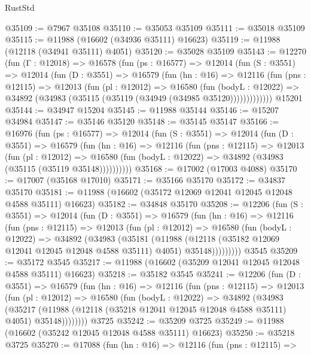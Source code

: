 \begin{lexlean}{RustStd}
\begin{coremodule}
@35109 := @7967 @35108
@35110 := @35053 @35109
@35111 := @35018 @35109
@35115 := @11988 (@16602 (@34936 @35111) @16623)
@35119 := @11988 (@12118 (@34941 @35111) @4051)
@35120 := @35028 @35109
@35143 := @12270
    (fun (Γ : @12018) =>
    @16578
      (fun (ps : @16577) =>
      @12014
        (fun (S : @3551) =>
        @12014
          (fun (D : @3551) =>
          @16579
            (fun (hn : @16) =>
            @12116
              (fun (pns : @12115) =>
              @12013
                (fun (pl : @12012) =>
                @16580
                  (fun (bodyL : @12022) =>
                  @34892 (@34983 (@35115 (@35119 (@34949 (@34985 @35120)))))))))))))
    @15201
@35144 := @34947 @15204
@35145 := @11988 @35144
@35146 := @15207 @34984
@35147 := @35146 @35120
@35148 := @35145 @35147
@35166 := @16976
    (fun (ps : @16577) =>
    @12014
      (fun (S : @3551) =>
      @12014
        (fun (D : @3551) =>
        @16579
          (fun (hn : @16) =>
          @12116
            (fun (pns : @12115) =>
            @12013
              (fun (pl : @12012) =>
              @16580 (fun (bodyL : @12022) => @34892 (@34983 (@35115 (@35119 @35148))))))))))
@35168 := @17002 (@17003 @4088)
@35170 := @17007 (@35168 @17010)
@35171 := @35166 @35170
@35172 := @34837 @35170
@35181 := @11988 (@16602 (@35172 @12069 @12041 @12045 @12048 @4588 @35111) @16623)
@35182 := @34848 @35170
@35208 := @12206
    (fun (S : @3551) =>
    @12014
      (fun (D : @3551) =>
      @16579
        (fun (hn : @16) =>
        @12116
          (fun (pns : @12115) =>
          @12013
            (fun (pl : @12012) =>
            @16580
              (fun (bodyL : @12022) =>
              @34892
                (@34983
                  (@35181
                    (@11988
                      (@12118 (@35182 @12069 @12041 @12045 @12048 @4588 @35111) @4051)
                      @35148)))))))))
    @3545
@35209 := @35172 @3545
@35217 := @11988 (@16602 (@35209 @12041 @12045 @12048 @4588 @35111) @16623)
@35218 := @35182 @3545
@35241 := @12206
    (fun (D : @3551) =>
    @16579
      (fun (hn : @16) =>
      @12116
        (fun (pns : @12115) =>
        @12013
          (fun (pl : @12012) =>
          @16580
            (fun (bodyL : @12022) =>
            @34892
              (@34983
                (@35217
                  (@11988 (@12118 (@35218 @12041 @12045 @12048 @4588 @35111) @4051) @35148))))))))
    @3725
@35242 := @35209 @3725
@35249 := @11988 (@16602 (@35242 @12045 @12048 @4588 @35111) @16623)
@35250 := @35218 @3725
@35270 := @17088
    (fun (hn : @16) =>
    @12116
      (fun (pns : @12115) =>

\end{coremodule}
\end{lexlean}

